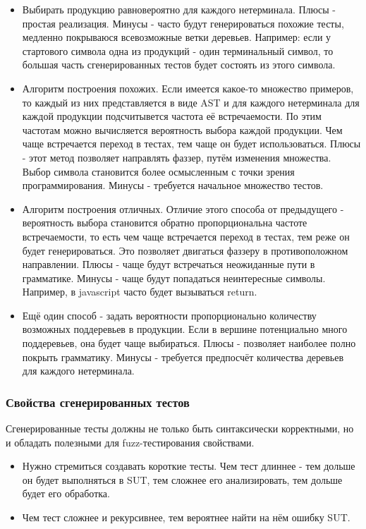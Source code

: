 \documentclass[a4paper]{article}
\begin{document}
\begin{itemize}
\item Выбирать продукцию равновероятно для каждого нетерминала\cite{litlink6}. Плюсы - простая реализация. Минусы - часто будут генерироваться похожие тесты, медленно покрываюся всевозможные ветки деревьев. Например: если у стартового символа одна из продукций - один терминальный символ, то большая часть сгенерированных тестов будет состоять из этого символа.
\item Алгоритм построения похожих\cite{litlink1}. Если имеется какое-то множество примеров, то каждый из них представляется в виде AST и для каждого нетерминала для каждой продукции подсчитывется частота её встречаемости. По этим частотам можно вычисляется вероятность выбора каждой продукции. Чем чаще встречается переход в тестах, тем чаще он будет использоваться. Плюсы - этот метод позволяет направлять фаззер, путём изменения множества. Выбор символа становится более осмысленным с точки зрения программирования. Минусы - требуется начальное множество тестов.
\item Алгоритм построения отличных\cite{litlink1}. Отличие этого способа от предыдущего - вероятность выбора становится обратно пропорциональна частоте встречаемости, то есть чем чаще встречается переход в тестах, тем реже он будет генерироваться. Это позволяет двигаться фаззеру в противоположном направлении. Плюсы - чаще будут встречаться неожиданные пути в грамматике. Минусы - чаще будут попадаться неинтересные символы. Например, в javascript часто будет вызываться return. 
\item Ещё один способ - задать вероятности пропорционально количеству возможных поддеревьев в продукции\cite{litlink6}. Если в вершине потенциально много поддеревьев, она будет чаще выбираться.
Плюсы - позволяет наиболее полно покрыть грамматику. 
Минусы - требуется предпосчёт количества деревьев для каждого нетерминала.
\end{itemize}

\subsubsection{Свойства сгенерированных тестов}
\indent

Сгенерированные тесты должны не только быть синтаксически корректными, но и обладать полезными для fuzz-тестирования свойствами.

\begin{itemize}
\item Нужно стремиться создавать короткие тесты. Чем тест длиннее - тем дольше он будет выполняться в SUT, тем сложнее его анализировать, тем дольше будет его обработка\cite{litlink2}. 
\item Чем тест сложнее и рекурсивнее, тем вероятнее найти на нём ошибку SUT\cite{litlink2}. 
\end{itemize}
\end{document}
